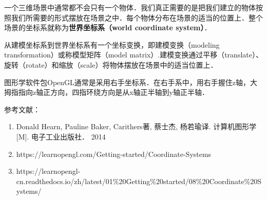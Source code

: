 

一个三维场景中通常都不会只有一个物体．我们真正需要的是把我们建立的物体按照我们所需要的形式摆放在场景之中．每个物体分布在场景的适当的位置上．整个场景的坐标系就称为\textbf{世界坐标系（world coordinate system）}．

从建模坐标系到世界坐标系有一个坐标变换，即建模变换（modeling transformation）或称模型矩阵（model matrix）.建模变换通过平移（translate）、旋转（rotate）和缩放（scale）将物体摆放在场景中的适当位置上．

图形学软件包OpenGL通常是采用右手坐标系．在右手系中，用右手握住z轴，大拇指指向z轴正方向，四指环绕方向是从x轴正半轴到y轴正半轴．




参考文献：
\begin{enumerate}
\item Donald Hearn, Pauline Baker, Carithers著, 蔡士杰, 杨若瑜译. 计算机图形学[M]. 电子工业出版社． 2014
\item https://learnopengl.com/Getting-started/Coordinate-Systems
\item https://learnopengl-cn.readthedocs.io/zh/latest/01\%20Getting\%20started/08\%20Coordinate\%20Systems/
\end{enumerate}